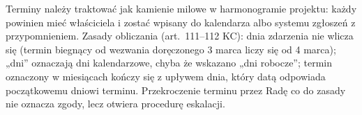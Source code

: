 \documentclass[11pt,a4paper]{report}
\begin{document}
\begin{OCoChodzi}
Terminy należy traktować jak kamienie milowe w harmonogramie projektu: każdy powinien mieć właściciela i zostać wpisany do kalendarza albo systemu zgłoszeń z przypomnieniem. Zasady obliczania (art.~111--112 KC): dnia zdarzenia nie wlicza się (termin biegnący od wezwania doręczonego 3 marca liczy się od 4 marca); „dni” oznaczają dni kalendarzowe, chyba że wskazano „dni robocze”; termin oznaczony w miesiącach kończy się z upływem dnia, który datą odpowiada początkowemu dniowi terminu. Przekroczenie terminu przez Radę co do zasady nie oznacza zgody, lecz otwiera procedurę eskalacji.
\end{OCoChodzi}


\end{document}

